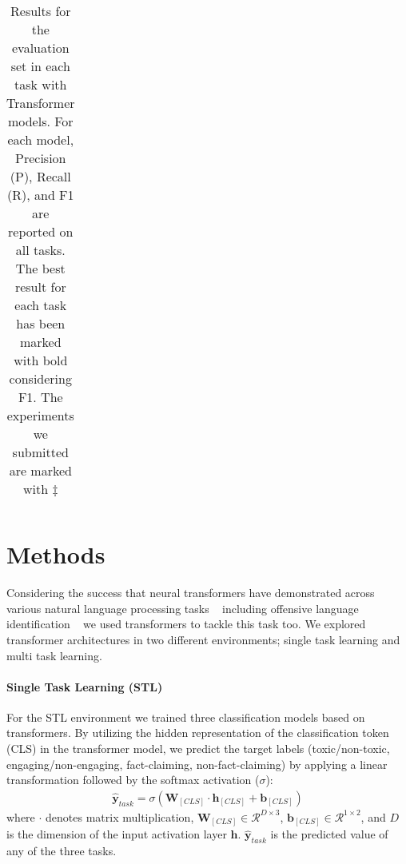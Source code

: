 \documentclass[11pt,a4paper]{article}
\begin{document}
\begin{table*}
{\begin{tabular}{l|c|ccc|ccc|ccc}
\hline
\end{tabular}
}
\caption{Results for the evaluation set in each task with Transformer models. For each model, Precision (P), Recall (R), and F1 are reported on all tasks. The best result for each task has been marked with bold considering F1. The experiments we submitted are marked with ${\ddagger}$}
\label{table:dev_result}
\end{table*}

\section{Methods}
\label{sec:methods}

Considering the success that neural transformers have demonstrated across various natural language processing tasks ~\cite{uyangodage-etal-2021,jauhiainen-etal-2021-comparing,hettiarachchi-ranasinghe-2020-brums} including offensive language identification ~\cite{ranasinghe-etal-2020-multilingual,ranasinghemudes,dai-etal-2020-kungfupanda} we used transformers to tackle this task too. We explored transformer architectures in two different environments; single task learning and multi task learning. 

\paragraph{Single Task Learning (STL)} For the STL environment we trained three classification models based on transformers. By utilizing the hidden representation of the classification token (\textsc{CLS}) in the transformer model, we predict the target labels (toxic/non-toxic, engaging/non-engaging, fact-claiming, non-fact-claiming) by applying a linear transformation followed by the softmax activation ($\sigma$):
\begin{align}
    \hat{\mathbf{y}}_{task} = \sigma(\mathbf{W}_{[CLS]} \cdot \mathbf{h}_{[CLS]} + \mathbf{b}_{[CLS]})
\end{align}
where $\cdot$ denotes matrix multiplication, $\mathbf{W}_{[CLS]} \in \mathcal{R}^{D \times 3}$, $\mathbf{b}_{[CLS]} \in \mathcal{R}^{1 \times 2}$, and $D$ is the dimension of the input activation layer $\mathbf{h}$. $\hat{\mathbf{y}}_{task}$ is the predicted value of any of the three tasks. 
\end{document}

